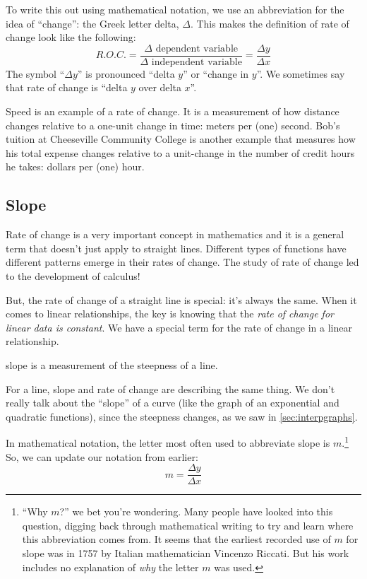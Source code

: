 To write this out using mathematical notation, we use an abbreviation for the idea of ``change'': the Greek letter delta, $\Delta$. This makes the definition of rate of change look like the following:
\[R.O.C. = \frac{\Delta \text{ dependent variable}}{\Delta \text{ independent variable}} = \frac{\Delta y}{\Delta x}\]
The symbol ``$\Delta y$'' is pronounced ``delta $y$'' or ``change in $y$''. We sometimes say that rate of change is ``delta $y$ over delta $x$''.


Speed is an example of a rate of change. It is a measurement of how distance changes relative to a one-unit change in time: meters per (one) second. Bob's tuition at Cheeseville Community College is another example that measures how his total expense changes relative to a unit-change in the number of credit hours he takes: dollars per (one) hour.


\subsection{Slope}

Rate of change is a very important concept in mathematics and it is a general term that doesn't just apply to straight lines. Different types of functions have different patterns emerge in their rates of change. The study of rate of change led to the development of calculus!

But, the rate of change of a straight line is special: it's always the same. When it comes to linear relationships, the key is knowing that the \textit{rate of change for linear data is constant}. We have a special term for the rate of change in a linear relationship.

\begin{boxdef}[Slope]
\Gls{slope} is a measurement of the steepness of a line.
\end{boxdef}

For a line, slope and rate of change are describing the same thing. We don't really talk about the ``slope'' of a curve (like the graph of an exponential and quadratic functions), since the steepness changes, as we saw in \cref{sec:interpgraphs}.

In mathematical notation, the letter most often used to abbreviate slope is $m$.\footnote{``Why $m$?'' we bet you're wondering. Many people have looked into this question, digging back through mathematical writing to try and learn where this abbreviation comes from. It seems that the earliest recorded use of $m$ for slope was in 1757 by Italian mathematician Vincenzo Riccati. But his work includes no explanation of \textit{why} the letter $m$ was used.} So, we can update our notation from earlier:
\[m = \frac{\Delta y}{\Delta x}\]

